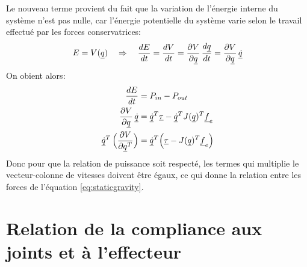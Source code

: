 
Le nouveau terme provient du fait que la variation de l'énergie interne du système n'est pas nulle, car l'énergie potentielle du système varie selon le travail effectué par les forces conservatrices:
\begin{align}
E = V( \underline{q} ) \quad \Rightarrow \quad \frac{dE}{dt} = \frac{dV}{dt} = \frac{\partial V}{ \partial \underline{q}} \, \frac{d \underline{q}}{dt} = \frac{\partial V}{ \partial \underline{q}} \, \underline{\dot{q}}
\end{align}
On obient alors:
\begin{align}
\frac{dE}{dt} &= P_{in} - P_{out} \\
\frac{\partial V}{ \partial \underline{q}} \, \underline{\dot{q}} &=  \underline{\dot{q}}^T \underline{\tau} - \underline{\dot{q}}^T  J( \underline{q})^T \underline{f}_e  \\
\underline{\dot{q}}^T  \, \Big(  \frac{\partial V}{ \partial \underline{q}^T} \Big) &=  \underline{\dot{q}}^T  \Big(\underline{\tau} -  J( \underline{q})^T \underline{f}_e  \Big)
\end{align}
Donc pour que la relation de puissance soit respecté, les termes qui multiplie le vecteur-colonne de vitesses doivent être égaux, ce qui donne la relation entre les forces de l'équation \eqref{eq:staticgravity}.




\section{Relation de la compliance aux joints et à l'effecteur}
\label{sec:manipcompliance}

